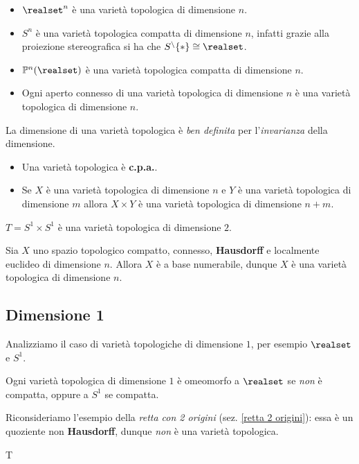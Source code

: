 \begin{examples}
	\begin{itemize}
		\item $\realset^n$ è una varietà topologica di dimensione $n$.
		\item $S^n$ è una varietà topologica compatta di dimensione $n$, infatti grazie alla proiezione stereografica si ha che $S^\setminus\{*\}\cong \realset$.
		\item $\mathbb{P}^n(\realset)$ è una varietà topologica compatta di dimensione $n$.
		\item Ogni aperto connesso di una varietà topologica di dimensione $n$ è una varietà topologica di dimensione $n$.
	\end{itemize}
\end{examples}
\begin{observe}
	La dimensione di una varietà topologica è \textit{ben definita} per l'\textit{invarianza} della dimensione.
\end{observe}
\begin{observe}
	\begin{itemize}
		\item Una varietà topologica è \textbf{c.p.a.}.
		\item Se $X$ è una varietà topologica di dimensione $n$ e $Y$ è una varietà topologica di dimensione $m$ allora $X\times Y$ è una varietà topologica di dimensione $n+m$.
	\end{itemize}
\end{observe}
\begin{example}
	$T=S^1\times S^1$ è una varietà topologica di dimensione $2$.
\end{example}

\begin{theorema}
	Sia $X$ uno spazio topologico compatto, connesso, \textbf{Hausdorff} e localmente euclideo di dimensione $n$. Allora $X$ è a base numerabile, dunque $X$ è una varietà topologica di dimensione $n$.
\end{theorema}
 
	\subsection{Dimensione 1}
Analizziamo il caso di varietà topologiche di dimensione $1$, per esempio $\realset$ e $S^1$.
\begin{theorema}
	Ogni varietà topologica di dimensione $1$ è omeomorfo a $\realset$ se \textit{non} è compatta, oppure a $S^1$ se compatta.
\end{theorema} 
\begin{example} 
Riconsideriamo l'esempio della \textit{retta con 2 origini} (sez. \ref{retta 2 origini}): essa è un quoziente non \textbf{Hausdorff}, dunque \textit{non} è una varietà topologica.
\end{example}T
